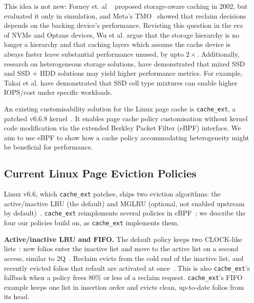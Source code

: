 \documentclass[11pt,sigconf,nonacm]{acmart}
\newcommand{\cacheExt}{\texttt{cache\_ext}}
\begin{document}
This idea is not new: Forney et. al ~\cite{Forney} proposed storage-aware caching in 2002, but evaluated it only in simulation, and Meta's TMO~\cite{tmo} showed that reclaim decisions depends on the backing device's performance. Revisting this question in the era of NVMe and Optane devices, Wu et al.\cite{orthus} argue that the storage hierarchy is no longer a hierarchy and that caching layers which assume the cache device is always faster leave substantial performance unused, by upto $2\times$. Additionally, research on heterogeneous storage solutions, have demonstrated that mixed SSD and SSD + HDD solutions may yield higher performance metrics. For example, Takai et al. \cite{heterogeneousssd} have demonstrated that SSD cell type mixtures can enable higher IOPS/cost under specific workloads.


An existing customisability solution for the Linux page cache is \texttt{cache\_ext}, a patched v6.6.8 kernel~\cite{cache_ext}. It enables page cache policy customisation without kernel code modification via the extended Berkley Packet Filter (eBPF) interface. We aim to use eBPF to show how a cache policy accommodating heterogeneity might be beneficial for performance.


\subsection{Current Linux Page Eviction Policies}
\label{sec:existing-policies}

Linux v6.6, which \cacheExt{} patches, ships two eviction algorithms: the active/inactive LRU (the default) and MGLRU (optional, not enabled upstream by default)~\cite{linuxv66src, cacheext}. \cacheExt{} reimplements several policies in eBPF~\cite{cacheext}; we describe the four our policies build on, as \cacheExt{} implements them.

\textbf{Active/inactive LRU and FIFO.} The default policy keeps two CLOCK-like lists~\cite{corbato1969paging}: new folios enter the inactive list and move to the active list on a second access, similar to 2Q~\cite{johnson1994twoq}. Reclaim evicts from the cold end of the inactive list, and recently evicted folios that refault are activated at once~\cite{linuxv66src}. This is also \cacheExt{}'s fallback when a policy frees 80\% or less of a reclaim request. \cacheExt{}'s FIFO example keeps one list in insertion order and evicts clean, up-to-date folios from its head.
\end{document}
